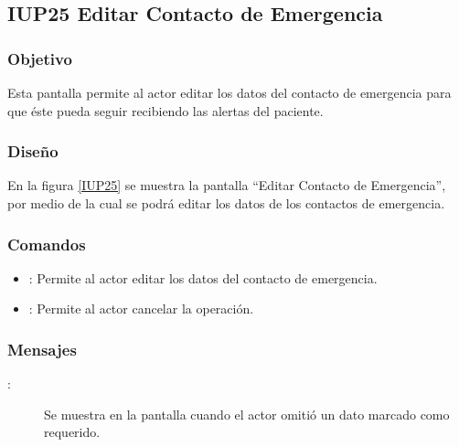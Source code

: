 \subsection{IUP25 Editar Contacto de Emergencia}
 
\subsubsection{Objetivo}

    Esta pantalla permite al actor editar los datos del contacto de emergencia para que éste pueda seguir recibiendo las alertas del paciente.

\subsubsection{Diseño}

    En la figura \ref{IUP25} se muestra la pantalla ``Editar Contacto de Emergencia'', por medio de la cual se podrá editar los datos de los contactos de emergencia. \\


\subsubsection{Comandos}
\begin{itemize}
    \item {}: Permite al actor editar los datos del contacto de emergencia.
    \item {}: Permite al actor cancelar la operación.
    
\end{itemize}

\subsubsection{Mensajes}

\begin{description}
    \item[:] Se muestra en la pantalla  cuando el actor omitió un dato marcado como requerido.
\end{description}
